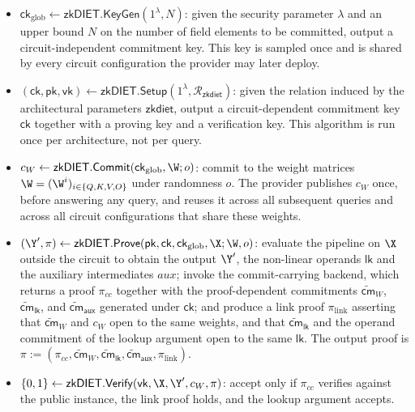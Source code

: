 \documentclass[runningheads]{llncs}
\begin{document}
\begin{itemize} [leftmargin=3mm, itemsep=2pt, topsep=2pt]
  \item $\mathsf{ck}_{\mathrm{glob}} \leftarrow \mathsf{zkDIET}.\mathsf{KeyGen}(1^{\lambda}, N)$:
        given the security parameter $\lambda$ and an upper bound $N$ on the number of field elements to be committed, output a circuit-independent commitment key. This key is sampled once and is shared by every circuit configuration the provider may later deploy.

  \item $(\mathsf{ck}, \mathsf{pk}, \mathsf{vk}) \leftarrow
        \mathsf{zkDIET}.\mathsf{Setup}(1^{\lambda}, \mathcal{R}_{\mathsf{zkdiet}})$:
        given the relation induced by the architectural parameters $\mathsf{zkdiet}$, output a circuit-dependent commitment key $\mathsf{ck}$ together with a proving key and a verification key. This algorithm is run once per architecture, not per query.

  \item $c_{W} \leftarrow
        \mathsf{zkDIET}.\mathsf{Commit}(\mathsf{ck}_{\mathrm{glob}}, \W; o)$:
        commit to the weight matrices $\W = (\W^{i})_{i \in \{Q,K,V,O\}}$ under randomness $o$. The provider publishes $c_{W}$ once, before answering any query, and reuses it across all subsequent queries and across all circuit configurations that share these weights.

  \item $(\Y', \pi) \leftarrow \mathsf{zkDIET}.\mathsf{Prove} (\mathsf{pk}, \mathsf{ck}, \mathsf{ck}_{\mathrm{glob}}, \X; \W, o)$:
        evaluate the pipeline on $\X$ outside the circuit to obtain the output $\Y'$, the non-linear operands $\mathsf{lk}$ and the auxiliary intermediates $\textit{aux}$; invoke the commit-carrying backend, which returns a proof $\pi_{cc}$ together with the proof-dependent commitments $\widetilde{\mathsf{cm}}_{W}$, $\widetilde{\mathsf{cm}}_{\mathsf{lk}}$, and $\widetilde{\mathsf{cm}}_{\mathsf{aux}}$ generated under $\mathsf{ck}$; and produce a link proof $\pi_{\mathrm{link}}$ asserting that $\widetilde{\mathsf{cm}}_{W}$ and $c_{W}$ open to the
        same weights, and that $\widetilde{\mathsf{cm}}_{\mathsf{lk}}$ and the operand commitment of the lookup argument open to the same $\mathsf{lk}$. The output
        proof is $\pi := (\pi_{cc}, \widetilde{\mathsf{cm}}_{W}, \widetilde{\mathsf{cm}}_{\mathsf{lk}}, \widetilde{\mathsf{cm}}_{\mathsf{aux}}, \pi_{\mathrm{link}})$.

  \item $\{0,1\} \leftarrow \mathsf{zkDIET}.\mathsf{Verify}(\mathsf{vk}, \X, \Y', c_{W}, \pi)$:
        accept only if $\pi_{cc}$ verifies against the public instance, the link proof holds, and the lookup argument accepts.
\end{itemize}
\end{document}

